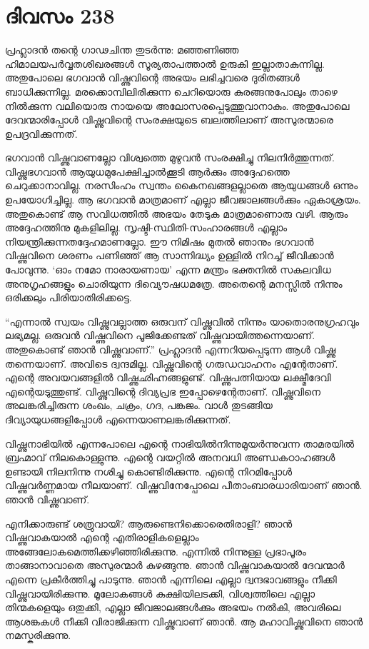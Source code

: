 \section{ദിവസം 238}


പ്രഹ്ലാദന്‍ തന്റെ ഗാഢചിന്ത തുടര്‍ന്നു: മഞ്ഞണിഞ്ഞ ഹിമാലയപര്‍വ്വതശിഖരങ്ങള്‍  സൂര്യതാപത്താല്‍ ഉരുകി ഇല്ലാതാകുന്നില്ല. അതുപോലെ ഭഗവാന്‍ വിഷ്ണുവിന്റെ അഭയം ലഭിച്ചവരെ ദുരിതങ്ങള്‍ ബാധിക്കുന്നില്ല. മരക്കൊമ്പിലിരിക്കുന്ന ചെറിയൊരു കുരങ്ങനുപോലും താഴെ നില്‍ക്കുന്ന വലിയൊരു നായയെ അലോസരപ്പെടുത്തുവാനാകും. അതുപോലെ ദേവന്മാരിപ്പോള്‍ വിഷ്ണുവിന്റെ സംരക്ഷയുടെ ബലത്തിലാണ് അസുരന്മാരെ ഉപദ്രവിക്കുന്നത്. 

ഭഗവാന്‍ വിഷ്ണുവാണല്ലോ വിശ്വത്തെ മുഴുവന്‍ സംരക്ഷിച്ചു നിലനിര്‍ത്തുന്നത്. വിഷ്ണുഭഗവാന്‍ ആയുധമുപേക്ഷിച്ചാല്‍ക്കൂടി ആര്‍ക്കും അദ്ദേഹത്തെ ചെറുക്കാനാവില്ല. നരസിംഹം സ്വന്തം കൈനഖങ്ങളല്ലാതെ ആയുധങ്ങള്‍ ഒന്നും ഉപയോഗിച്ചില്ല. ആ ഭഗവാന്‍ മാത്രമാണ് എല്ലാ ജീവജാലങ്ങള്‍ക്കും ഏകാശ്രയം. അതുകൊണ്ട് ആ സവിധത്തില്‍ അഭയം തേടുക മാത്രമാണൊരു വഴി. ആരും അദ്ദേഹത്തിനു മുകളിലില്ല. സൃഷ്ടി-സ്ഥിതി-സംഹാരങ്ങള്‍ എല്ലാം നിയന്ത്രിക്കുന്നതദ്ദേഹമാണല്ലോ. ഈ നിമിഷം മുതല്‍ ഞാനും ഭഗവാന്‍ വിഷ്ണുവിനെ ശരണം പണിഞ്ഞ് ആ സാന്നിദ്ധ്യം ഉള്ളില്‍ നിറച്ച് ജീവിക്കാന്‍ പോവുന്നു. ‘ഓം നമോ നാരായണായ’ എന്ന മന്ത്രം ഭക്തനില്‍ സകലവിധ അനുഗൃഹങ്ങളും ചൊരിയുന്ന ദിവ്യൌഷധമത്രേ. അതെന്റെ മനസ്സില്‍ നിന്നും ഒരിക്കലും പിരിയാതിരിക്കട്ടെ.

“എന്നാല്‍ സ്വയം വിഷ്ണുവല്ലാത്ത ഒരുവന് വിഷ്ണുവില്‍ നിന്നും യാതൊരനുഗ്രഹവും ലഭ്യമല്ല. ഒരുവന്‍ വിഷ്ണുവിനെ പൂജിക്കേണ്ടത് വിഷ്ണുവായിത്തന്നെയാണ്. അതുകൊണ്ട് ഞാന്‍ വിഷ്ണുവാണ്.” പ്രഹ്ലാദന്‍ എന്നറിയപ്പെടുന്ന ആള്‍ വിഷ്ണു തന്നെയാണ്. അവിടെ ദ്വന്ദമില്ല. വിഷ്ണുവിന്റെ ഗരുഡവാഹനം എന്റേതാണ്. എന്റെ അവയവങ്ങളില്‍ വിഷ്ണുഛിഹ്നങ്ങളുണ്ട്. വിഷ്ണുപത്നിയായ ലക്ഷ്മീദേവി എന്റെയടുത്തുണ്ട്. വിഷ്ണുവിന്റെ ദിവ്യപ്രഭ ഇപ്പോഴെന്റേതാണ്. വിഷ്ണുവിനെ അലങ്കരിച്ചിരുന്ന ശംഖം, ചക്രം, ഗദ, പങ്കജം. വാള്‍ തുടങ്ങിയ ദിവ്യായുധങ്ങളിപ്പോള്‍ എന്നെയാണലങ്കരിക്കുന്നത്.

വിഷ്ണുനാഭിയില്‍ എന്നപോലെ എന്റെ നാഭിയില്‍നിന്നുമുയര്‍ന്നുവന്ന താമരയില്‍ ബ്രഹ്മാവ്‌ നിലകൊള്ളുന്നു. എന്റെ വയറ്റില്‍ അനവധി അണ്ഡകഠാഹങ്ങള്‍ ഉണ്ടായി നിലനിന്നു നശിച്ചു കൊണ്ടിരിക്കുന്നു. എന്റെ നിറമിപ്പോള്‍ വിഷ്ണുവര്‍ണ്ണമായ നീലയാണ്. വിഷ്ണുവിനേപ്പോലെ പീതാംബാരധാരിയാണ് ഞാന്‍. ഞാന്‍ വിഷ്ണുവാണ്.

എനിക്കാരുണ്ട് ശത്രുവായി? ആരുണ്ടെനിക്കൊരെതിരാളി? ഞാന്‍ വിഷ്ണുവാകയാല്‍ എന്റെ എതിരാളികളെല്ലാം അങ്ങേലോകമെത്തിക്കഴിഞ്ഞിരിക്കുന്നു. എന്നില്‍ നിന്നുള്ള പ്രഭാപൂരം താങ്ങാനാവാതെ അസുരന്മാര്‍ കുഴങ്ങുന്നു. ഞാന്‍ വിഷ്ണുവാകയാല്‍ ദേവന്മാര്‍ എന്നെ പ്രകീര്‍ത്തിച്ചു പാടുന്നു. ഞാന്‍ എന്നിലെ എല്ലാ ദ്വന്ദഭാവങ്ങളും നീക്കി വിഷ്ണുവായിരിക്കുന്നു. മൂലോകങ്ങള്‍ കുക്ഷിയിലടക്കി, വിശ്വത്തിലെ എല്ലാ തിന്മകളെയും ഒതുക്കി, എല്ലാ ജീവജാലങ്ങള്‍ക്കും അഭയം നല്‍കി, അവരിലെ ആശങ്കകള്‍ നീക്കി വിരാജിക്കുന്ന വിഷ്ണുവാണ് ഞാന്‍. ആ മഹാവിഷ്ണുവിനെ ഞാന്‍ നമസ്കരിക്കുന്നു.

